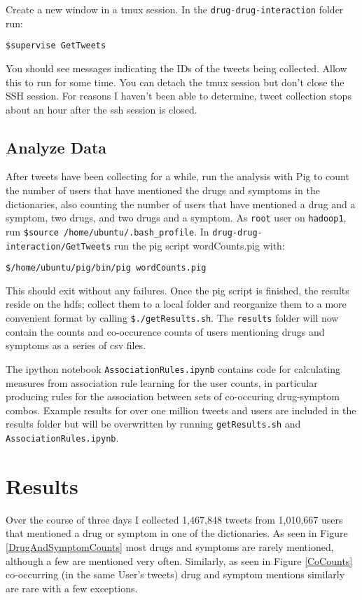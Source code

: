\documentclass[letterpaper]{article}
\begin{document}
Create a new window in a tmux session. In the \lstinline|drug-drug-interaction| folder run:
\begin{lstlisting}
$supervise GetTweets
\end{lstlisting} 
You should see messages indicating the IDs of the tweets being collected. Allow this to run for some time. You can detach the tmux session but don't close the SSH session. For reasons I haven't been able to determine, tweet collection stops about an hour after the ssh session is closed. 

\subsection{Analyze Data}

After tweets have been collecting for a while, run the analysis with Pig to count the number of users that have mentioned the drugs and symptoms in the dictionaries, also counting the number of users that have mentioned a drug and a symptom, two drugs, and two drugs and a symptom. As \lstinline|root| user on \lstinline|hadoop1|, run \lstinline|$source /home/ubuntu/.bash_profile|. In \lstinline|drug-drug-interaction/GetTweets| run the pig script wordCounts.pig with:
\begin{lstlisting}
$/home/ubuntu/pig/bin/pig wordCounts.pig
\end{lstlisting}
This should exit without any failures. Once the pig script is finished, the results reside on the hdfs; collect them to a local folder and reorganize them to a more convenient format by calling \lstinline|$./getResults.sh|. The \lstinline|results| folder will now contain the counts and co-occurence counts of users mentioning drugs and symptoms as a series of csv files.

The ipython notebook \lstinline|AssociationRules.ipynb| contains code for calculating measures from association rule learning for the user counts, in particular producing rules for the association between sets of co-occuring drug-symptom combos. Example results for over one million tweets and users are included in the results folder but will be overwritten by running \lstinline|getResults.sh| and \lstinline|AssociationRules.ipynb|.

\section{Results}

Over the course of three days I collected 1,467,848 tweets from 1,010,667 users that mentioned a drug or symptom in one of the dictionaries. As seen in Figure \ref{DrugAndSymptomCounts} most drugs and symptoms are rarely mentioned, although a few are mentioned very often. Similarly, as seen in Figure \ref{CoCounts} co-occurring (in the same User's tweets) drug and symptom mentions similarly are rare with a few exceptions.
\end{document}
